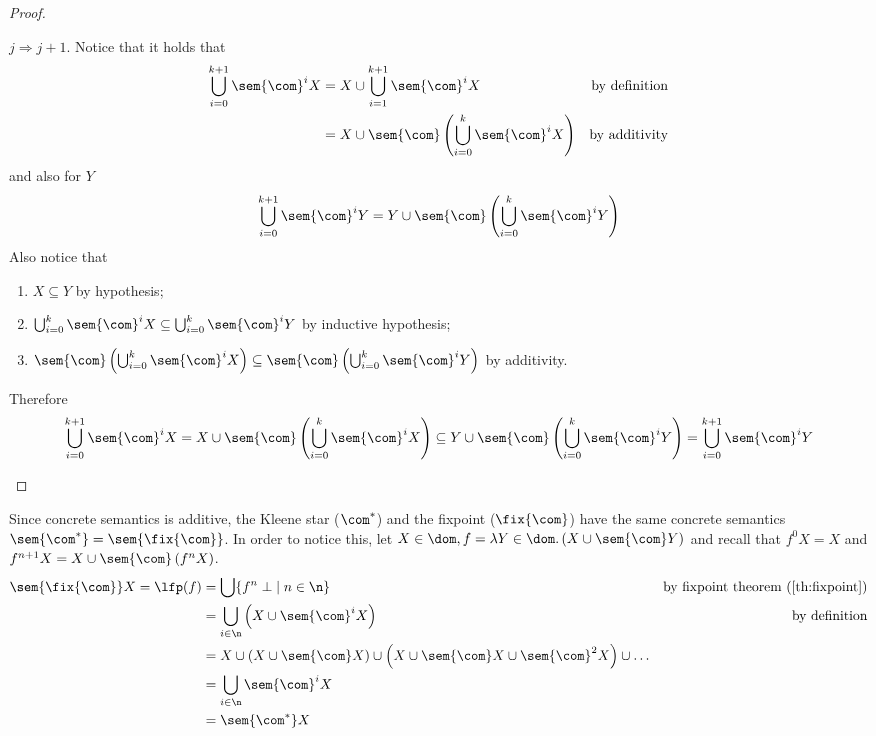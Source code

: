\begin{proof}
\begin{itemize}
\begin{itemize}
      \(j \Rightarrow j+1\). Notice that it holds that
      \begin{align*}
        \bigcup_{i=0}^{k+1}\sem{\com}^i X & = X \cup \bigcup_{i=1}^{k+1}\sem{\com}^i X & \text{by definition} \\
                                          & = X \cup \sem{\com}\left(\bigcup_{i=0}^{k}\sem{\com}^i X\right) & \text{by additivity}
      \end{align*}
      and also for \(Y\)
      \begin{equation*}
        \bigcup_{i=0}^{k+1}\sem{\com}^i Y = Y \cup \sem{\com}\left(\bigcup_{i=0}^{k}\sem{\com}^i Y\right)
      \end{equation*}
      Also notice that
      \begin{enumerate}[label=(\roman*)]
      \item \(X \subseteq Y\) by hypothesis;
      \item
        \(\bigcup_{i=0}^{k}\sem{\com}^i X \subseteq
        \bigcup_{i=0}^{k}\sem{\com}^i Y\) by inductive hypothesis;
      \item 
        \(\sem{\com}\left(\bigcup_{i=0}^{k}\sem{\com}^i X\right)
        \subseteq \sem{\com}\left(\bigcup_{i=0}^{k}\sem{\com}^i
          Y\right)\) by additivity.
      \end{enumerate}
      Therefore
      \[\bigcup_{i=0}^{k+1}\sem{\com}^i X = X \cup
        \sem{\com}\left(\bigcup_{i=0}^{k}\sem{\com}^i X\right)
        \subseteq Y \cup \sem{\com}\left(\bigcup_{i=0}^{k}\sem{\com}^i
          Y\right) = \bigcup_{i=0}^{k+1}\sem{\com}^i Y \]
    \end{itemize}
  \end{itemize}
\end{proof}

Since concrete semantics is additive, the Kleene star (\(\com^*\)) and
the fixpoint (\(\fix{\com}\)) have the same concrete semantics
\(\sem{\com^*} = \sem{\fix{\com}}\). In order to notice this, let
\(X \in \dom, f = \lambda Y \in\dom . \left(X \cup
  \sem{\com}Y\right)\) and recall that \(f^0 X = X\) and 
\(f^{n+1} X = X \cup \sem{\com}\left(f^n X\right)\).
\begin{align*}
  \sem{\fix{\com}}X = \lfp(f) & = \bigcup \{ f^n \; \bot \mid n \in \n \} & \text{by fixpoint theorem (\ref{th:fixpoint})} \\
                              & = \bigcup_{i\in\n} \left( X \cup \sem{\com}^iX \right) & \text{by definition} \\
                              & = X \cup \left( X \cup \sem{\com}X \right) \cup \left( X \cup \sem{\com}X \cup \sem{\com}^2X \right) \cup \dots \\
                              & = \bigcup_{i\in\n} \sem{\com}^i X \\
                              & = \sem{\com^*}X
\end{align*}

